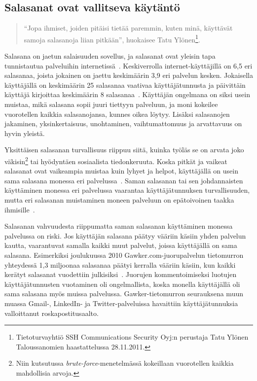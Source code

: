 \documentclass[finnish,gradu]{tktltiki}
\begin{document}
  \subsection{Salasanat ovat vallitseva käytäntö} %
  \label{sub:salasanat}

  \begin{quote}
    ``Jopa ihmiset, joiden pitäisi tietää paremmin, kuten minä, käyttävät samoja salasanoja liian pitkään'', huokaisee Tatu Ylönen\footnote{Tietoturvayhtiö SSH Communications Security Oyj:n perustaja Tatu Ylönen Taloussanomien haastattelussa 28.11.2011.}.
  \end{quote}

  Salasana on jaetun salaisuuden sovellus, ja salasanat ovat yleisin tapa tunnistautua palveluihin internetissä~\cite{study_of_passwords_07, passpet_06, password_management_strategies_06, pwdhash_extension_05}. Keskiverrolla internet-käyttäjillä on 6,5 eri salasanaa, joista jokainen on jaettu keskimäärin 3,9 eri palvelun kesken. Jokaisella käyttäjällä on keskimäärin 25 salasanaa vaativaa käyttäjätunnusta ja päivittäin käyttäjä kirjoittaa keskimäärin 8 salasanaa~\cite{study_of_passwords_07}. Käyttäjän ongelmana on siksi usein muistaa, mikä salasana sopii juuri tiettyyn palveluun, ja moni kokeilee vuorotellen kaikkia salasanojansa, kunnes oikea löytyy. Lisäksi salasanojen jakaminen, yksinkertaisuus, unohtaminen, vaihtumattomuus ja arvattavuus on hyvin yleistä.

  Yksittäisen salasanan turvallisuus riippuu siitä, kuinka työläs se on arvata joko väkisin\footnote{Niin kutsutussa \emph{brute-force}-menetelmässä kokeillaan vuorotellen kaikkia mahdollisia arvoja.} tai hyödyntäen sosiaalista tiedonkeruuta. Koska pitkät ja vaikeat salasanat ovat vaikeampia muistaa kuin lyhyet ja helpot, käyttäjällä on usein sama salasana monessa eri palvelussa~\cite{study_of_passwords_07}. Saman salasanan tai sen johdannaisten käyttäminen monessa eri palvelussa vaarantaa käyttäjätunnuksen turvallisuuden, mutta eri salasanan muistaminen moneen palveluun on epätoivoinen taakka ihmisille~\cite{password_management_strategies_06, passpet_06, pw_auth_system_perspective_08, users_are_not_the_enemy_99}.

  Salasanan vahvuudesta riippumatta saman salasanan käyttäminen monessa palvelussa on riski. Jos käyttäjän salasana päätyy vääriin käsiin yhden palvelun kautta, vaarantuvat samalla kaikki muut palvelut, joissa käyttäjällä on sama salasana. Esimerkiksi joulukuussa 2010 Gawker.com-juorupalvelun tietomurron yhteydessä 1,3 miljoonaa salasanaa päätyi kerralla vääriin käsiin, kun kaikki kerätyt salasanat vuodettiin julkisiksi~\cite{bbc_gawker_12_2010, forbes_gawker_12_2010}. Juorujen kommentoimiseksi luotujen käyttäjätunnusten vuotaminen oli ongelmallista, koska monella käyttäjällä oli sama salasana myös muissa palvelussa. Gawker-tietomurron seurauksena muun muassa Gmail-, LinkedIn- ja Twitter-palveluissa havaittiin käyttäjätunnuksia valloittanut roskapostitusaalto.
\end{document}
